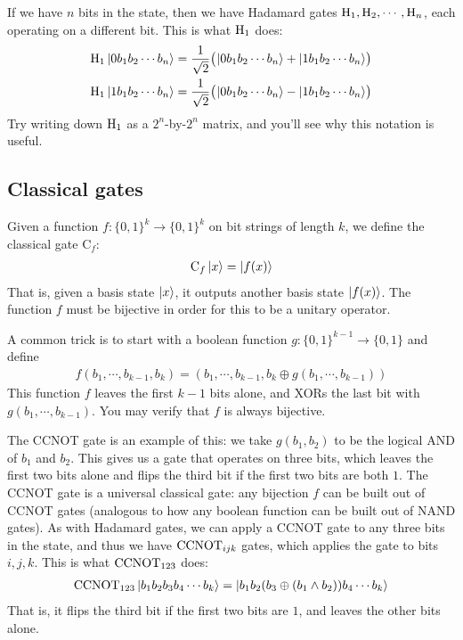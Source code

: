 If we have $n$ bits in the state, then we have Hadamard gates $\mathrm{H}_1, \mathrm{H}_2, \cdots, \mathrm{H}_n$, each operating on a different bit.
This is what $\mathrm{H}_1$ does:
\begin{align}
  \mathrm{H}_1 \ket{0 b_1 b_2 \cdots b_n} = \frac{1}{\sqrt{2}}\big(\kern-0.1em \ket{0 b_1 b_2 \cdots b_n} + \ket{1 b_1 b_2 \cdots b_n}\!\big) \label{eqn:hadamard}\\
  \mathrm{H}_1 \ket{1 b_1 b_2 \cdots b_n} = \frac{1}{\sqrt{2}}\big(\kern-0.1em \ket{0 b_1 b_2 \cdots b_n} - \ket{1 b_1 b_2 \cdots b_n}\!\big)
\end{align}
Try writing down $\mathrm{H}_1$ as a $2^n$-by-$2^n$ matrix, and you'll see why this notation is useful.

\subsection{Classical gates}

\newcommand{\Cl}{\mathrm{C}}

Given a function $f : \{0,1\}^k \to \{0,1\}^k$ on bit strings of length $k$, we define the classical gate $\Cl_f$:
\begin{align}
  \Cl_f \ket{x} = \ket{f(x)}         \label{eqn:classicalgate}
\end{align}
That is, given a basis state $\ket{x}$, it outputs another basis state $\ket{f(x)}$.
The function $f$ must be bijective in order for this to be a unitary operator.

A common trick is to start with a boolean function $g : \{0,1\}^{k-1} \to \{0,1\}$ and define
\begin{align}
  f(b_1,\cdots,b_{k-1},b_k) = (b_1,\cdots,b_{k-1}, b_k \oplus g(b_1,\cdots,b_{k-1}))     \label{eqn:xortrick}
\end{align}
This function $f$ leaves the first $k-1$ bits alone, and XORs the last bit with $g(b_1,\cdots,b_{k-1})$.
You may verify that $f$ is always bijective.

The CCNOT gate is an example of this: we take $g(b_1,b_2)$ to be the logical AND of $b_1$ and $b_2$.
This gives us a gate that operates on three bits, which leaves the first two bits alone and flips the third bit if the first two bits are both $1$.
The CCNOT gate is a universal classical gate: any bijection $f$ can be built out of CCNOT gates (analogous to how any boolean function can be built out of NAND gates).
As with Hadamard gates, we can apply a CCNOT gate to any three bits in the state, and thus we have $\mathrm{CCNOT}_{ijk}$ gates,
which applies the gate to bits $i,j,k$. This is what $\mathrm{CCNOT}_{123}$ does:
\begin{align*}
  \mathrm{CCNOT}_{123} \ket{b_1 b_2 b_3 b_4 \cdots b_k} = \ket{b_1 b_2 (b_3 \oplus (b_1 \wedge b_2)) b_4 \cdots b_k}
\end{align*}
That is, it flips the third bit if the first two bits are $1$, and leaves the other bits alone.

